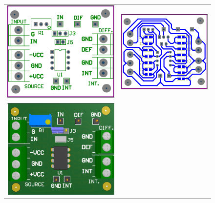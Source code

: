 \begin{figure}[H]
	\centering
	\begin{tabular}{c c}
		\includegraphics[scale=0.6]{../EJ4/Recursos/Altium/Placa_OVERLAY.png} &
		\includegraphics[scale=0.6]{../EJ4/Recursos/Altium/Placa_PCB.png} \\
		\includegraphics[scale=0.6]{../EJ4/Recursos/Altium/Placa_3D_OVERLAY.png} &

\end{tabular}
\end{figure}
